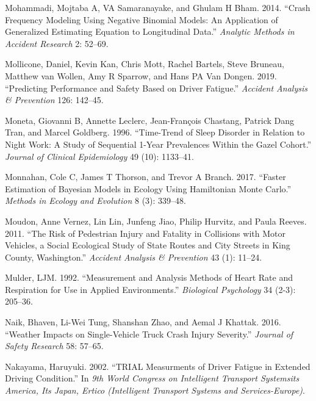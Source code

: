 \documentclass[12pt]{book}
\numberwithin{equation}{chapter}
\begin{document}
\leavevmode\hypertarget{ref-mohammadi2014crash}{}%
Mohammadi, Mojtaba A, VA Samaranayake, and Ghulam H Bham. 2014. ``Crash Frequency Modeling Using Negative Binomial Models: An Application of Generalized Estimating Equation to Longitudinal Data.'' \emph{Analytic Methods in Accident Research} 2: 52--69.

\leavevmode\hypertarget{ref-mollicone2019predicting}{}%
Mollicone, Daniel, Kevin Kan, Chris Mott, Rachel Bartels, Steve Bruneau, Matthew van Wollen, Amy R Sparrow, and Hans PA Van Dongen. 2019. ``Predicting Performance and Safety Based on Driver Fatigue.'' \emph{Accident Analysis \& Prevention} 126: 142--45.

\leavevmode\hypertarget{ref-moneta1996time}{}%
Moneta, Giovanni B, Annette Leclerc, Jean-François Chastang, Patrick Dang Tran, and Marcel Goldberg. 1996. ``Time-Trend of Sleep Disorder in Relation to Night Work: A Study of Sequential 1-Year Prevalences Within the Gazel Cohort.'' \emph{Journal of Clinical Epidemiology} 49 (10): 1133--41.

\leavevmode\hypertarget{ref-monnahan2017faster}{}%
Monnahan, Cole C, James T Thorson, and Trevor A Branch. 2017. ``Faster Estimation of Bayesian Models in Ecology Using Hamiltonian Monte Carlo.'' \emph{Methods in Ecology and Evolution} 8 (3): 339--48.

\leavevmode\hypertarget{ref-moudon2011risk}{}%
Moudon, Anne Vernez, Lin Lin, Junfeng Jiao, Philip Hurvitz, and Paula Reeves. 2011. ``The Risk of Pedestrian Injury and Fatality in Collisions with Motor Vehicles, a Social Ecological Study of State Routes and City Streets in King County, Washington.'' \emph{Accident Analysis \& Prevention} 43 (1): 11--24.

\leavevmode\hypertarget{ref-mulder1992measurement}{}%
Mulder, LJM. 1992. ``Measurement and Analysis Methods of Heart Rate and Respiration for Use in Applied Environments.'' \emph{Biological Psychology} 34 (2-3): 205--36.

\leavevmode\hypertarget{ref-naik2016weather}{}%
Naik, Bhaven, Li-Wei Tung, Shanshan Zhao, and Aemal J Khattak. 2016. ``Weather Impacts on Single-Vehicle Truck Crash Injury Severity.'' \emph{Journal of Safety Research} 58: 57--65.

\leavevmode\hypertarget{ref-nakayama2002trial}{}%
Nakayama, Haruyuki. 2002. ``TRIAL Measurments of Driver Fatigue in Extended Driving Condition.'' In \emph{9th World Congress on Intelligent Transport Systemsits America, Its Japan, Ertico (Intelligent Transport Systems and Services-Europe)}.
\end{document}
